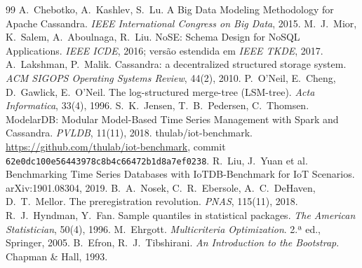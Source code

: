 \documentclass[11pt,a4paper]{article}
\begin{document}
\begin{thebibliography}{99}\small
{} A.~Chebotko, A.~Kashlev, S.~Lu. A Big Data Modeling Methodology for Apache Cassandra. \emph{IEEE International Congress on Big Data}, 2015.
 M.~J.~Mior, K.~Salem, A.~Aboulnaga, R.~Liu. NoSE: Schema Design for NoSQL Applications. \emph{IEEE ICDE}, 2016; versão estendida em \emph{IEEE TKDE}, 2017.
 A.~Lakshman, P.~Malik. Cassandra: a decentralized structured storage system. \emph{ACM SIGOPS Operating Systems Review}, 44(2), 2010.
 P.~O'Neil, E.~Cheng, D.~Gawlick, E.~O'Neil. The log-structured merge-tree (LSM-tree). \emph{Acta Informatica}, 33(4), 1996.
 S.~K.~Jensen, T.~B.~Pedersen, C.~Thomsen. ModelarDB: Modular Model-Based Time Series Management with Spark and Cassandra. \emph{PVLDB}, 11(11), 2018.
 thulab/iot-benchmark. \url{https://github.com/thulab/iot-benchmark}, commit \texttt{62e0dc100e56443978c8b4c66472b1d8a7ef0238}.
 R.~Liu, J.~Yuan et al. Benchmarking Time Series Databases with IoTDB-Benchmark for IoT Scenarios. arXiv:1901.08304, 2019.
 B.~A.~Nosek, C.~R.~Ebersole, A.~C.~DeHaven, D.~T.~Mellor. The preregistration revolution. \emph{PNAS}, 115(11), 2018.
 R.~J.~Hyndman, Y.~Fan. Sample quantiles in statistical packages. \emph{The American Statistician}, 50(4), 1996.
 M.~Ehrgott. \emph{Multicriteria Optimization}. 2.ª ed., Springer, 2005.
 B.~Efron, R.~J.~Tibshirani. \emph{An Introduction to the Bootstrap}. Chapman \& Hall, 1993.
\end{thebibliography}
\end{document}
